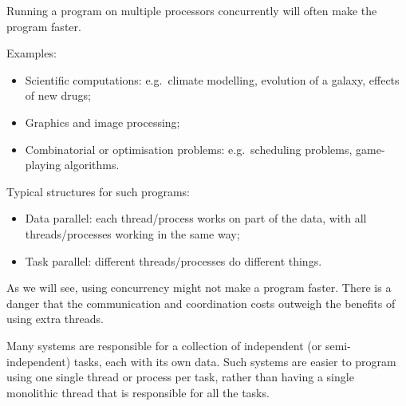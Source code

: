 \documentclass[notes,color]{sepslide0}
\begin{document}

\begin{slide}

Running a program on multiple processors concurrently will often make the
program faster.

Examples:
%
\begin{itemize}
\item
Scientific computations: e.g.~climate modelling, evolution of a galaxy,
effects of new drugs;

\item
Graphics and image processing;

\item
Combinatorial or optimisation problems: e.g.~scheduling problems, game-playing
algorithms.
\end{itemize}

Typical structures for such programs:
%
\begin{itemize}
\item
Data parallel: each thread/process works on part of the data, with all
threads/processes working in the same way;

\item
Task parallel: different threads/processes do different things.
\end{itemize}
%
\end{slide}


\begin{slide}

As we will see, using concurrency might not make a program faster.  There is a
danger that the communication and coordination costs outweigh the benefits of
using extra threads.
\end{slide}


\begin{slide}

Many systems are responsible for a collection of independent (or
semi-independent) tasks, each with its own data.  Such systems are easier to
program using one single thread or process per task, rather than having a
single monolithic thread that is responsible for all the tasks.
\end{slide}

\end{document}
